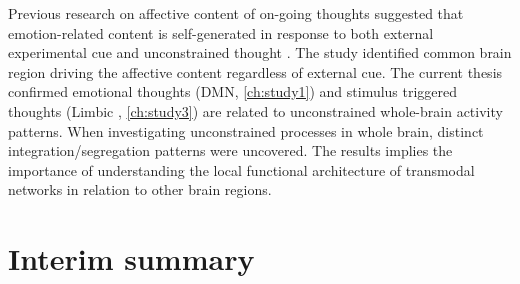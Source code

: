 Previous research on affective content of on-going thoughts suggested that emotion-related content is self-generated in response to both external experimental cue and unconstrained thought \cite{Tusche2014}. The study identified common brain region driving the affective content regardless of external cue. The current thesis confirmed emotional thoughts (DMN, \cref{ch:study1}) and stimulus triggered thoughts (Limbic , \cref{ch:study3}) are related to unconstrained whole-brain activity patterns. When investigating unconstrained processes in whole brain, distinct integration/segregation patterns were uncovered. The results implies the importance of understanding the local functional architecture \cite{Braga2015} of transmodal networks in relation to other brain regions. 

\section{Interim summary}




